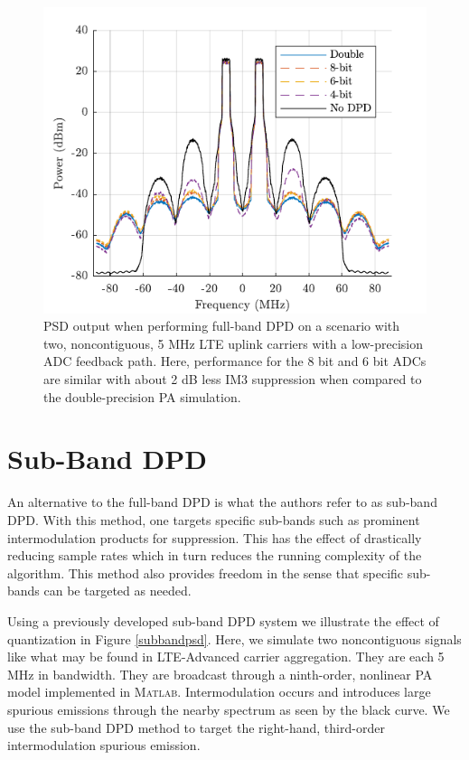\documentclass[conference]{IEEEtran}
\begin{document}
\begin{figure}[]
\centering
\includegraphics[]{FullBandPSD}
\caption{PSD output when performing full-band DPD on a scenario with two, noncontiguous, 5 MHz LTE uplink carriers with a low-precision ADC feedback path. Here, performance for the 8 bit and 6 bit ADCs are similar with about 2 dB less IM3 suppression when compared to the double-precision PA simulation.}
\label{fullbandpsd}
\end{figure}


\section{Sub-Band DPD}
An alternative to the full-band DPD is what the authors refer to as sub-band DPD. 
With this method, one targets specific sub-bands such as prominent intermodulation products for suppression. 
This has the effect of drastically reducing sample rates which in turn reduces the running complexity of the algorithm. 
This method also provides freedom in the sense that specific sub-bands can be targeted as needed. 

Using a previously developed sub-band DPD system \cite{TMTT_SubbandDPD} we illustrate the effect of quantization in Figure \ref{subbandpsd}. Here, we simulate two noncontiguous signals like what may be found in LTE-Advanced carrier aggregation. They are each 5 MHz in bandwidth. They are broadcast through a ninth-order, nonlinear PA model implemented in \textsc{Matlab}. 
Intermodulation occurs and introduces large spurious emissions through the nearby spectrum as seen by the black curve. We use the sub-band DPD method to target the right-hand, third-order intermodulation spurious emission.
\end{document}
